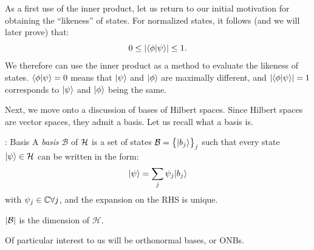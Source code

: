 As a first use of the inner product, let us return to our initial motivation for obtaining the ``likeness'' of states. For normalized states, it follows (and we will later prove) that:
\begin{equation}
    0 \leq \abs{\braket{\phi}{\psi}} \leq 1.
\end{equation}
We therefore can use the inner product as a method to evaluate the likeness of states. $\braket{\phi}{\psi} = 0$ means that $\lvert \psi \rangle$ and $\ket{\phi}$ are maximally different, and $\abs{\braket{\phi}{\psi}} = 1$ corresponds to $\lvert \psi \rangle$ and $\ket{\phi}$ being the same.

Next, we move onto a discussion of bases of Hilbert spaces. Since Hilbert spaces are vector spaces, they admit a basis. Let us recall what a basis is.

\begin{defbox}{: Basis}\label{def-basis}
    A \emph{basis} $\mathcal{B}$ of $\mathcal{H}$ is a set of states $\mathcal{B} = \set{\lvert b_j \rangle}_j$ such that every state $\lvert \psi \rangle \in \mathcal{H}$ can be written in the form:
    \begin{equation}\label{eq-expandpsibasis}
        \lvert \psi \rangle = \sum_j \psi_j \lvert b_j \rangle
    \end{equation}
    with $\psi_j \in \mathbb{C} \forall j$, and the expansion on the RHS is unique.

    $\lvert \mathcal{B} \rvert$ is the dimension of $\mathcal{H}$\footnotemark. 
\end{defbox}

Of particular interest to us will be orthonormal bases, or ONBs.

